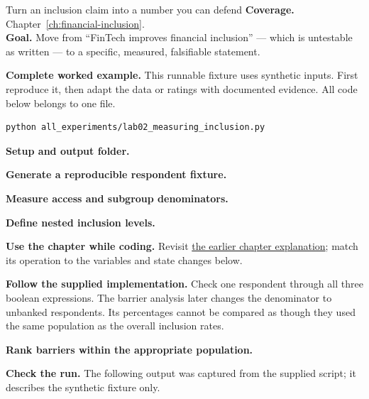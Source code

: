 
\begin{labproject}{Turn an inclusion claim into a number you can defend}
\textbf{Coverage.} Chapter~\ref{ch:financial-inclusion}.\\
\textbf{Goal.} Move from ``FinTech improves financial inclusion'' --- which is untestable as written --- to a specific, measured, falsifiable statement.




\end{labproject}

\textbf{Complete worked example.} This runnable fixture uses synthetic inputs. First reproduce it, then adapt the data or ratings with documented evidence. All code below belongs to one file.
\begin{lstlisting}[style=utpterminal]
python all_experiments/lab02_measuring_inclusion.py
\end{lstlisting}

\noindent\textbf{Setup and output folder.}


\noindent\textbf{Generate a reproducible respondent fixture.}


\noindent\textbf{Measure access and subgroup denominators.}



\noindent\textbf{Define nested inclusion levels.}


\textbf{Use the chapter while coding.} Revisit \hyperref[ch:financial-inclusion]{the earlier chapter explanation}; match its operation to the variables and state changes below.

\textbf{Follow the supplied implementation.} Check one respondent through all three boolean expressions. The barrier analysis later changes the denominator to unbanked respondents. Its percentages cannot be compared as though they used the same population as the overall inclusion rates.




\noindent\textbf{Rank barriers within the appropriate population.}


\textbf{Check the run.} The following output was captured from the supplied script; it describes the synthetic fixture only.




